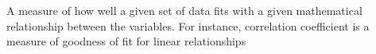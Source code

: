 A measure of how well a given set of data fits with a given mathematical relationship
between the variables. For instance, correlation coefficient is a measure of 
goodness of fit for linear relationships